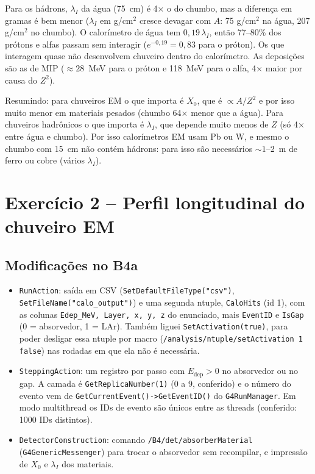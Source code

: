 \documentclass[a4paper,11pt]{article}
\begin{document}
\noindent Para os hádrons, $\lambda_I$ da água (75~cm) é 4× o do chumbo, mas a diferença em gramas é bem menor
($\lambda_I$ em g/cm$^2$ cresce devagar com $A$: 75 g/cm$^2$ na água, 207 g/cm$^2$ no chumbo). O calorímetro de água tem
$0{,}19\,\lambda_I$, então 77--80\% dos prótons e alfas passam sem interagir ($e^{-0{,}19} = 0{,}83$ para o próton).
Os que interagem quase não desenvolvem chuveiro dentro do calorímetro. As deposições são as de MIP
($\approx 28$~MeV para o próton e 118~MeV para o alfa, 4× maior por causa do $Z^2$).

\noindent Resumindo: para chuveiros EM o que importa é $X_0$, que é $\propto A/Z^2$ e por isso muito menor em materiais
pesados (chumbo 64× menor que a água). Para chuveiros hadrônicos o que importa é $\lambda_I$, que depende muito
menos de $Z$ (só 4× entre água e chumbo). Por isso calorímetros EM usam Pb ou W, e mesmo o chumbo com 15~cm
não contém hádrons: para isso são necessários $\sim 1$--2~m de ferro ou cobre (vários $\lambda_I$).

\section{Exercício 2 -- Perfil longitudinal do chuveiro EM}

\subsection{Modificações no B4a}\label{sec:mod}

\begin{itemize}
  \item \texttt{RunAction}: saída em CSV (\texttt{SetDefaultFileType("csv")}, \texttt{SetFileName("calo\_output")}) e uma
    segunda ntuple, \texttt{CaloHits} (id 1), com as colunas \texttt{Edep\_MeV, Layer, x, y, z} do enunciado, mais
    \texttt{EventID} e \texttt{IsGap} (0 = absorvedor, 1 = LAr). Também liguei \texttt{SetActivation(true)}, para poder
    desligar essa ntuple por macro (\texttt{/analysis/ntuple/setActivation 1 false}) nas rodadas em que ela não
    é necessária.
  \item \texttt{SteppingAction}: um registro por passo com $E_\text{dep}>0$ no absorvedor ou no gap. A camada é
    \texttt{GetReplicaNumber(1)} (0 a 9, conferido) e o número do evento vem de
    \texttt{GetCurrentEvent()->GetEventID()} do \texttt{G4RunManager}.
    Em modo multithread os IDs de evento são únicos entre as threads (conferido: 1000 IDs distintos).
  \item \texttt{DetectorConstruction}: comando \texttt{/B4/det/absorberMaterial} (\texttt{G4GenericMessenger}) para
    trocar o absorvedor sem recompilar, e impressão de $X_0$ e $\lambda_I$ dos materiais.
\end{itemize}
\end{document}
